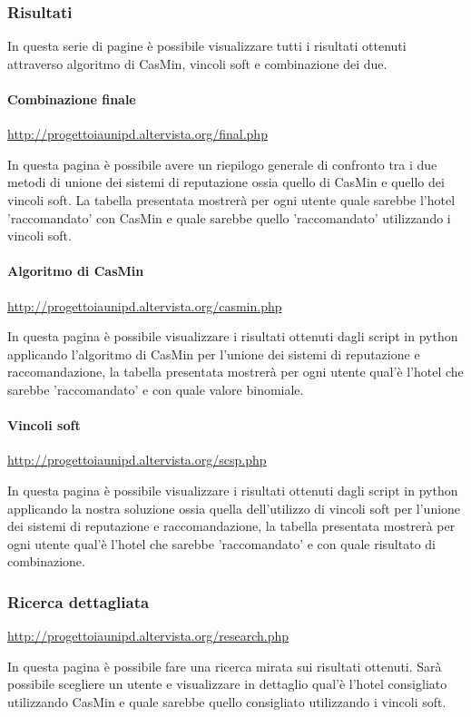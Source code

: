 \documentclass{report}
\newcommand{\myparagraph}[1]{\paragraph{#1}\mbox{} \mbox{}}
\begin{document}
	\subsubsection{Risultati}
	
	In questa serie di pagine è possibile visualizzare tutti i risultati ottenuti attraverso algoritmo di CasMin, vincoli soft e combinazione dei due.
	
	\myparagraph{Combinazione finale}
	
	\url{http://progettoiaunipd.altervista.org/final.php}
	\newline
	
	In questa pagina è possibile avere un riepilogo generale di confronto tra i due metodi di unione dei sistemi di reputazione ossia quello di CasMin e quello dei vincoli soft. La tabella presentata mostrerà per ogni utente quale sarebbe l'hotel 'raccomandato' con CasMin e quale sarebbe quello 'raccomandato' utilizzando i vincoli soft.
	
	\myparagraph{Algoritmo di CasMin}
	
	\url{http://progettoiaunipd.altervista.org/casmin.php}
	\newline
	
	In questa pagina è possibile visualizzare i risultati ottenuti dagli script in python applicando l'algoritmo di CasMin per l'unione dei sistemi di reputazione e raccomandazione, la tabella presentata mostrerà per ogni utente qual'è l'hotel che sarebbe 'raccomandato' e con quale valore binomiale.
	
	\myparagraph{Vincoli soft}
	
	\url{http://progettoiaunipd.altervista.org/scsp.php}
	\newline
	
	In questa pagina è possibile visualizzare i risultati ottenuti dagli script in python applicando la nostra soluzione ossia quella dell'utilizzo di vincoli soft per l'unione dei sistemi di reputazione e raccomandazione, la tabella presentata mostrerà per ogni utente qual'è l'hotel che sarebbe 'raccomandato' e con quale risultato di combinazione.
	
	\subsubsection{Ricerca dettagliata}
	
	\url{http://progettoiaunipd.altervista.org/research.php}
	\newline
	
	In questa pagina è possibile fare una ricerca mirata sui risultati ottenuti. Sarà possibile scegliere un utente e visualizzare in dettaglio qual'è l'hotel consigliato utilizzando CasMin e quale sarebbe quello consigliato utilizzando i vincoli soft.
	
\end{document}

